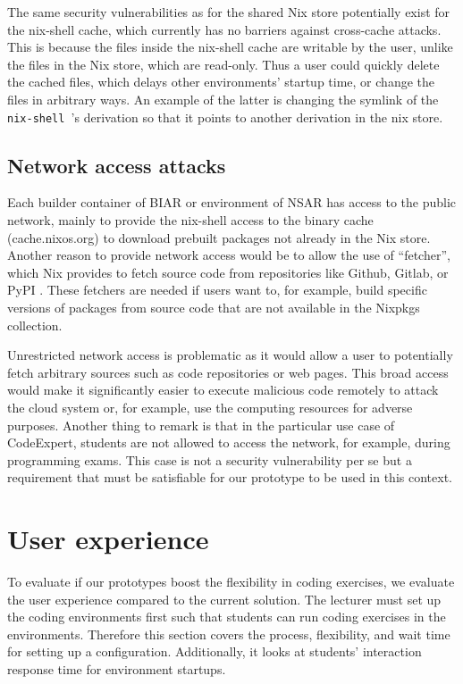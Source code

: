 The same security vulnerabilities as for the shared Nix store potentially exist for the nix-shell cache, which currently has no barriers against cross-cache attacks. This is because the files inside the nix-shell cache are writable by the user, unlike the files in the Nix store, which are read-only. Thus a user could quickly delete the cached files, which delays other environments’ startup time, or change the files in arbitrary ways. An example of the latter is changing the symlink of the \verb|nix-shell |’s derivation so that it points to another derivation in the nix store.

\subsection{Network access attacks}\label{security:network-access-attacks}
Each builder container of BIAR or environment of NSAR has access to the public network, mainly to provide the nix-shell access to the binary cache (cache.nixos.org) to download prebuilt packages not already in the Nix store. Another reason to provide network access would be to allow the use of ``fetcher'', which Nix provides to fetch source code from repositories like Github, Gitlab, or PyPI \cite{NixFetchers}. These fetchers are needed if users want to, for example, build specific versions of packages from source code that are not available in the Nixpkgs collection.

Unrestricted network access is problematic as it would allow a user to potentially fetch arbitrary sources such as code repositories or web pages. This broad access would make it significantly easier to execute malicious code remotely to attack the cloud system or, for example, use the computing resources for adverse purposes. Another thing to remark is that in the particular use case of CodeExpert, students are not allowed to access the network, for example, during programming exams. This case is not a security vulnerability per se but a requirement that must be satisfiable for our prototype to be used in this context.


\section{User experience}\label{result:UX}
To evaluate if our prototypes boost the flexibility in coding exercises, we evaluate the user experience compared to the current solution. The lecturer must set up the coding environments first such that students can run coding exercises in the environments. Therefore this section covers the process, flexibility, and wait time for setting up a configuration. Additionally, it looks at students' interaction response time for environment startups. %

